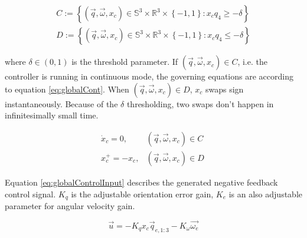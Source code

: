 \begin{align}
\label{eq:contDiscont}
C:= \left\lbrace (\vec{q},\vec{\omega},x_c) \in \mathbb{S}^3 \times \mathbb{R}^3 \times \left\lbrace -1,1 \right\rbrace : x_c q_4 \geq -\delta \right\rbrace  \\
\nonumber D:= \left\lbrace (\vec{q},\vec{\omega},x_c) \in \mathbb{S}^3 \times \mathbb{R}^3 \times \left\lbrace -1,1 \right\rbrace : x_cq_4 \leq -\delta \right\rbrace 
\end{align}

where $\delta \in (0,1)$ is the threshold parameter. If $(\vec{q},\vec{\omega},x_c) \in C$, i.e. the controller is running in continuous mode, the governing equations are according to equation \ref{eq:globalCont}. When $(\vec{q},\vec{\omega},x_c) \in D$, $x_c$ swaps sign instantaneously. Because of the $\delta$ thresholding, two swaps don't happen in infinitesimally small time.  

\begin{align}
	\label{eq:globalCont}
\dot{x}_c = 0, & (\vec{q},\vec{\omega},x_c)  \in C \\
\label{eq:globalDiscont}
x_c^+ = -x_c, & (\vec{q},\vec{\omega},x_c) \in D\
\end{align}

Equation \ref{eq:globalControlInput} describes the generated negative feedback control signal. $K_q$ is the adjustable orientation error gain, $K_e$ is an also adjustable parameter for angular velocity gain.

\begin{equation}
\label{eq:globalControlInput}
\vec{u} = -K_q x_c \vec{q}_{e, 1:3} -K_\omega \vec{\omega_e}
\end{equation}





